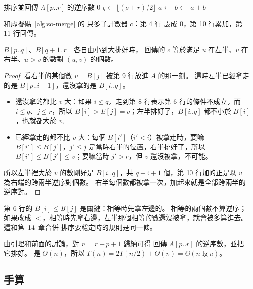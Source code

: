 \begin{pseudo}[label=alg:dc-sort-count]{排序並回傳 $A[p..r]$ 的逆序數}
        \State \Return $0$
    \EndIf
    \State $q \gets \lfloor (p + r)/2 \rfloor$
    \State $a \gets$ 
    \State $b \gets$ 
    \State \Return $a + b + $
\EndFunction
\end{pseudo}

 和虛擬碼~\ref{alg:so-merge} 的  只多了計數器 $c$：第 4 行
設成 $0$，第 10 行累加，第 11 行回傳。

\begin{lemma}
\label{lem:dc-cross}
$B[p..q]$、$B[q+1..r]$ 各自由小到大排好時， 回傳的 $c$ 等於滿足
$u$ 在左半、$v$ 在右半、$u > v$ 的數對 $(u, v)$ 的個數。
\end{lemma}

\begin{proof}
看右半的某個數 $v = B[j]$ 被第 9 行放進 $A$ 的那一刻。 這時左半已經拿走的是
$B[p..i-1]$，還沒拿的是 $B[i..q]$。
\begin{itemize}
\item 還沒拿的都比 $v$ 大：如果 $i \le q$，走到第 8 行表示第 6 行的條件不成立，而
$i \le q$、$j \le r$，所以 $B[i] > B[j] = v$；左半排好了，$B[i..q]$ 都不小於
$B[i]$，也就都大於 $v$。
\item 已經拿走的都不比 $v$ 大：每個 $B[i']$（$i' < i$）被拿走時，要嘛
$B[i'] \le B[j']$，$j' \le j$ 是當時右半的位置，右半排好了，所以
$B[i'] \le B[j'] \le v$；要嘛當時 $j' > r$，但 $v$ 還沒被拿，不可能。
\end{itemize}
所以左半裡大於 $v$ 的數剛好是 $B[i..q]$，共 $q - i + 1$ 個，第 10 行加的正是以 $v$
為右端的跨兩半逆序對個數。 右半每個數都被拿一次，加起來就是全部跨兩半的逆序對。
\end{proof}

第 6 行的 $B[i] \le B[j]$ 是關鍵：相等時先拿左邊的。 相等的兩個數不算逆序；如果改成
$<$，相等時先拿右邊，左半那個相等的數還沒被拿，就會被多算進去。 這和第~14~章合併
排序要穩定時的規則是同一條。

由引理和前面的討論，對 $n = r - p + 1$ 歸納可得  回傳
$A[p..r]$ 的逆序數，並把它排好。  是 $\Theta(n)$，所以
$T(n) = 2T(n/2) + \Theta(n) = \Theta(n \lg n)$。

\subsection{手算}

